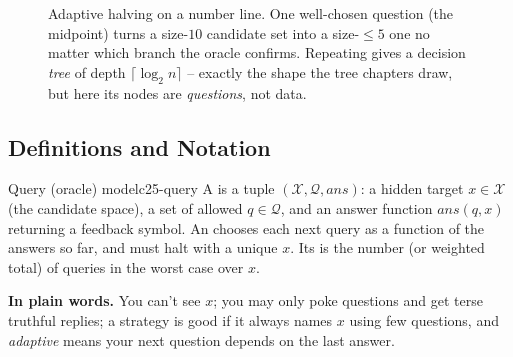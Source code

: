 \begin{figure}[H]
\centering
{}
\caption{Adaptive halving on a number line. One well-chosen question (the midpoint) turns a size-$10$
candidate set into a size-$\le5$ one no matter which branch the oracle confirms. Repeating gives a
decision \emph{tree} of depth $\lceil\log_2 n\rceil$ -- exactly the shape the tree chapters draw, but
here its nodes are \emph{questions}, not data.}\label{fig:c25-halve}
\end{figure}

\subsection{Definitions and Notation}

\begin{definition}{Query (oracle) model}{c25-query}
A  is a tuple $(\mathcal{X},\mathcal{Q},\mathit{ans})$: a hidden target
$x\in\mathcal{X}$ (the candidate space), a set of allowed  $q\in\mathcal{Q}$, and an
answer function $\mathit{ans}(q,x)$ returning a feedback symbol. An  chooses
each next query as a function of the answers so far, and must halt with a unique $x$. Its
 is the number (or weighted total) of queries in the worst case over $x$.
\end{definition}

\noindent\textbf{In plain words.} You can't see $x$; you may only poke questions and get terse
truthful replies; a strategy is good if it always names $x$ using few questions, and \emph{adaptive}
means your next question depends on the last answer.

